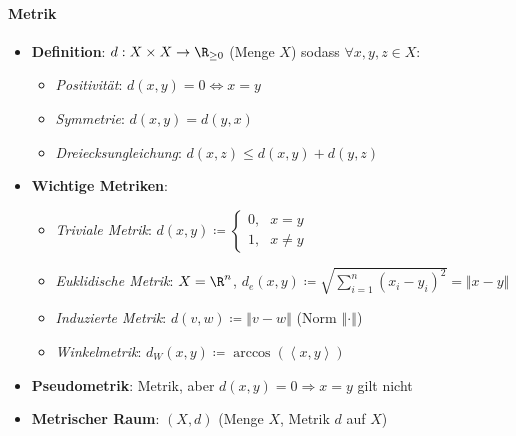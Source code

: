 \paragraph{Metrik}
\begin{itemize}
  \item \textbf{Definition}: \( d: X \times X \to \R_{\geq 0} \) (Menge \( X \)) sodass \( \forall x,y,z \in X: \)
  \begin{itemize}
    \item \emph{Positivität}: \( d(x,y) = 0 \Leftrightarrow x = y \)
    \item \emph{Symmetrie}: \( d(x,y) = d(y,x) \)
    \item \emph{Dreiecksungleichung}: \( d(x,z) \leq d(x,y) + d(y,z) \)
  \end{itemize}
  \item \textbf{Wichtige Metriken}:
  \begin{itemize}
    \item \emph{Triviale Metrik}: \( d(x,y) \coloneqq \begin{cases}
      0\text{,} &x=y \\ 1\text{,} &x \neq y
    \end{cases} \)
    \item \emph{Euklidische Metrik}: \( X = \R^n \), \( d_e(x, y) \coloneqq \sqrt{\sum_{i=1}^n(x_i-y_i)^2} = \Vert x-y \Vert \)
    \item \emph{Induzierte Metrik}: \( d(v,w) \coloneqq \left\Vert v - w \right\Vert \) (Norm \( \left\Vert \cdot \right\Vert \))
    \item \emph{Winkelmetrik}: \( d_W(x,y) \coloneqq \arccos(\left\langle x,y \right\rangle) \)
  \end{itemize}
  \item \textbf{Pseudometrik}: Metrik, aber \( d(x,y) = 0 \Rightarrow x = y \) gilt nicht
  \item \textbf{Metrischer Raum}: \( (X,d) \) (Menge \( X \), Metrik \( d \) auf \( X \))
\end{itemize}


